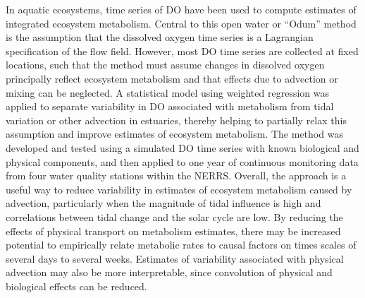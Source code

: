 In aquatic ecosystems, time series of \ac{DO} have been used to compute estimates of integrated ecosystem metabolism.  Central to this open water or ``Odum'' method is the assumption that the dissolved oxygen time series is a Lagrangian specification of the flow field.  However, most \ac{DO} time series are collected at fixed locations, such that the method must assume changes in dissolved oxygen principally reflect ecosystem metabolism and that effects due to advection or mixing can be neglected.  A statistical model using weighted regression was applied to separate variability in \ac{DO} associated with metabolism from tidal variation or other advection in estuaries, thereby helping to partially relax this assumption and improve estimates of ecosystem metabolism. The method was developed and tested using a simulated \ac{DO} time series with known biological and physical components, and then applied to one year of continuous monitoring data from four water quality stations within the \acl*{NERRS}.  Overall, the approach is a useful way to reduce variability in estimates of ecosystem metabolism caused by advection, particularly when the magnitude of tidal influence is high and correlations between tidal change and the solar cycle are low. By reducing the effects of physical transport on metabolism estimates, there may be increased potential to empirically relate metabolic rates to causal factors on times scales of several days to several weeks. Estimates of variability associated with physical advection may also be more interpretable, since convolution of physical and biological effects can be reduced.